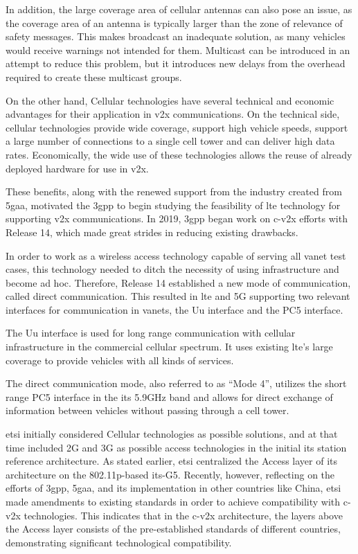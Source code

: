 In addition, the large coverage area of cellular antennas can also pose an issue, as the coverage area of an antenna is typically larger than the zone of relevance of safety messages. This makes broadcast an inadequate solution, as many vehicles would receive warnings not intended for them. Multicast can be introduced in an attempt to reduce this problem, but it introduces new delays from the overhead required to create these multicast groups\cite{gyawali_challenges_2021}.

On the other hand, Cellular technologies have several technical and economic advantages for their application in \gls{v2x} communications. On the technical side, cellular technologies provide wide coverage, support high vehicle speeds, support a large number of connections to a single cell tower and can deliver high data rates. Economically, the wide use of these technologies allows the reuse of already deployed hardware for use in \gls{v2x}\cite{gyawali_challenges_2021}.

These benefits, along with the renewed support from the industry created from \gls{5gaa}, motivated the \gls{3gpp} to begin studying the feasibility of \gls{lte} technology for supporting \gls{v2x} communications\cite{gyawali_challenges_2021}. In 2019, \gls{3gpp} began work on \gls{c-v2x} efforts with Release 14, which made great strides in reducing existing drawbacks.

In order to work as a wireless access technology capable of serving all \gls{vanet} test cases, this technology needed to ditch the necessity of using infrastructure and become ad hoc. Therefore, Release 14 established a new mode of communication, called direct communication.\cite{weber_c-v2x_2019} This resulted in \gls{lte} and 5G supporting two relevant interfaces for communication in \glspl{vanet}, the Uu interface and the PC5 interface.

The Uu interface is used for long range communication with cellular infrastructure in the commercial cellular spectrum. It uses existing \gls{lte}'s large coverage to provide vehicles with all kinds of services\cite{weber_c-v2x_2019}.

The direct communication mode, also referred to as “Mode 4”, utilizes the short range PC5 interface in the \gls{its} 5.9GHz band and allows for direct exchange of information between vehicles without passing through a cell tower.


\gls{etsi} initially considered Cellular technologies as possible solutions, and at that time included 2G and 3G as possible access technologies in the initial \gls{its} station reference architecture. As stated earlier, \gls{etsi} centralized the Access layer of its architecture on the 802.11p-based \gls{its}-G5. Recently, however, reflecting on the efforts of \gls{3gpp}, \gls{5gaa}, and \gls{its} implementation in other countries like China, \gls{etsi} made amendments to existing standards in order to achieve compatibility with \gls{c-v2x} technologies\cite{weber_c-v2x_2019}. This indicates that in the \gls{c-v2x} architecture, the layers above the Access layer consists of the pre-established standards of different countries, demonstrating significant technological compatibility.



